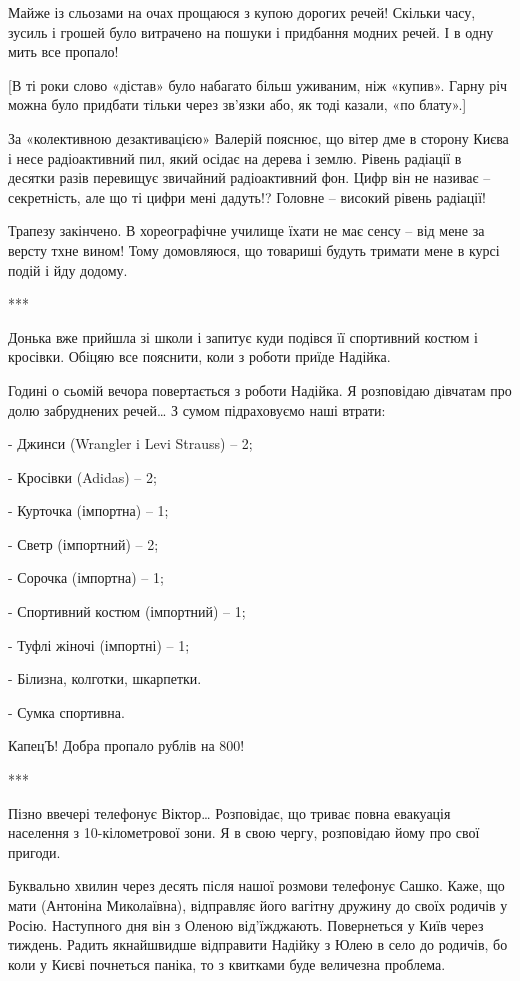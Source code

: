 Майже із сльозами на очах прощаюся з купою дорогих речей! Скільки часу, зусиль
і грошей було витрачено на пошуки і придбання модних речей. І в одну мить все
пропало! 

[В ті роки слово «дістав» було набагато більш уживаним, ніж «купив». Гарну річ
можна було придбати тільки через зв’язки або, як тоді казали, «по блату».]

За «колективною дезактивацією» Валерій пояснює, що вітер дме в сторону Києва і
несе радіоактивний пил, який осідає на дерева і землю. Рівень радіації в
десятки разів перевищує звичайний радіоактивний фон. Цифр він не називає –
секретність, але що ті цифри мені дадуть!? Головне – високий рівень радіації!

Трапезу закінчено. В хореографічне училище їхати не має сенсу – від мене за
версту тхне вином! Тому домовляюся, що товариші будуть тримати мене в курсі
подій і йду додому. 

***

Донька вже прийшла зі школи і запитує куди подівся її спортивний костюм і
кросівки. Обіцяю все пояснити, коли з роботи приїде Надійка. 

Годині о сьомій вечора повертається з роботи Надійка. Я розповідаю дівчатам про
долю забруднених речей… З сумом підраховуємо наші втрати:

- Джинси (Wrangler i Levi Strauss) – 2;

- Кросівки (Adidas) – 2;

- Курточка (імпортна) – 1;

- Светр (імпортний) – 2;

- Сорочка (імпортна) – 1;

- Спортивний костюм (імпортний) – 1;

- Туфлі жіночі (імпортні) – 1;

- Білизна, колготки, шкарпетки.

- Сумка спортивна.

КапецЪ! Добра пропало рублів на 800! 

***

Пізно ввечері телефонує Віктор… Розповідає, що триває повна евакуація населення
з 10-кілометрової зони. Я в свою чергу, розповідаю йому про свої пригоди. 

Буквально хвилин через десять після нашої розмови телефонує Сашко. Каже, що
мати (Антоніна Миколаївна), відправляє його вагітну дружину до своїх родичів у
Росію. Наступного дня він з Оленою від’їжджають. Повернеться у Київ через
тиждень. Радить якнайшвидше відправити Надійку з Юлею в село до родичів, бо
коли у Києві почнеться паніка, то з квитками буде величезна проблема.

